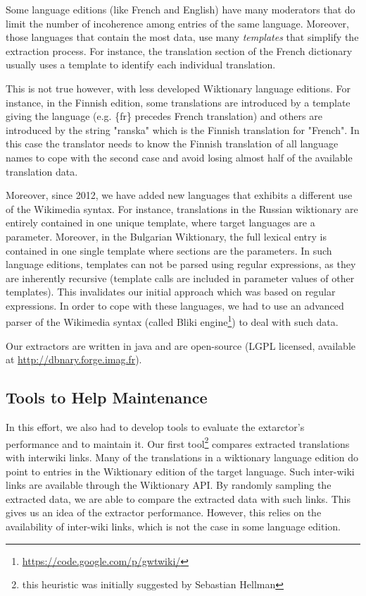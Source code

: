 \documentclass[10pt, a4paper]{article}
\begin{document}
Some language editions (like French and English) have many moderators that do limit the number of incoherence among entries of the same language. Moreover, those languages that contain the most data, use many \textit{templates} that simplify the extraction process. For instance, the translation section of the French dictionary usually uses a template to identify each individual translation.

This is not true however, with less developed Wiktionary language editions. For instance, in the Finnish edition, some translations are introduced by a template giving the language (e.g. \{fr\} precedes French translation) and others are introduced by the string "ranska" which is the Finnish translation for "French". In this case the translator needs to know the Finnish translation of all language names to cope with the second case and avoid losing almost half of the available translation data.

Moreover, since 2012, we have added new languages that exhibits a different use of the Wikimedia syntax. For instance, translations in the Russian wiktionary are entirely contained in one unique template, where target languages are a parameter. Moreover, in the Bulgarian Wiktionary, the full lexical entry is contained in one single template where sections are the parameters. In such language editions, templates can not be parsed using regular expressions, as they are inherently recursive (template calls are included in parameter values of other templates). This invalidates our initial approach which was based on regular expressions. In order to cope with these languages, we had to use an advanced parser of the Wikimedia syntax (called Bliki engine\footnote{\url{https://code.google.com/p/gwtwiki/}}) to deal with such data.

Our extractors are written in java and are open-source (LGPL licensed, available at \url{http://dbnary.forge.imag.fr}).

\subsection{Tools to Help Maintenance}

In this effort, we also had to develop tools to evaluate the extarctor's performance and to maintain it. Our first tool\footnote{this heuristic was initially suggested by Sebastian Hellman} compares extracted translations with interwiki links. Many of the translations in a wiktionary language edition do point to entries in the Wiktionary edition of the target language. Such inter-wiki links are available through the Wiktionary API. By randomly sampling the extracted data, we are able to compare the extracted data with such links. This gives us an idea of the extractor performance. However, this relies on the availability of inter-wiki links, which is not the case in some language edition.
\end{document}
